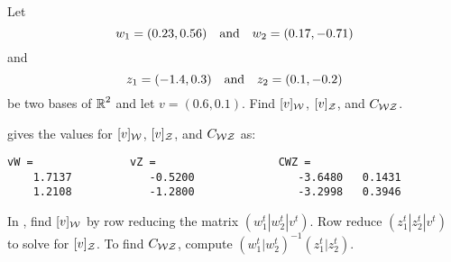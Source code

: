 \documentclass{ximera}
\begin{document}
\begin{computerExercise} \label{c7.1.5}
Let
\[
w_1 = (0.23,0.56) \quad\mbox{and}\quad w_2 = (0.17,-0.71)
\]
and
\[
z_1 = (-1.4,0.3) \quad\mbox{and}\quad z_2 = (0.1,-0.2)
\]
be two bases of $\mbox{$\Bbb{R}$}^2$ and let $v=(0.6,0.1)$.  Find $[v]_{\cal
W}$, $[v]_{\cal Z}$, and $C_{\cal WZ}$.

\begin{solution}

\ans \Matlab gives the values for $[v]_{\cal W}$, $[v]_{\cal Z}$, and
$C_{\cal WZ}$ as:
\begin{verbatim}
vW =               vZ =                   CWZ =
    1.7137            -0.5200                -3.6480   0.1431
    1.2108            -1.2800                -3.2998   0.3946
\end{verbatim}

\soln In \Matlabp, find $[v]_{\cal W}$ by row reducing
the matrix $(w_1^t|w_2^t | v^t)$.  Row reduce 
$(z_1^t|z_2^t | v^t)$ to solve for $[v]_{\cal Z}$.  To find
$C_{\cal WZ}$, compute $(w_1^t|w_2^t)^{-1}(z_1^t|z_2^t)$.

\end{solution}
\end{computerExercise}
\end{document}
